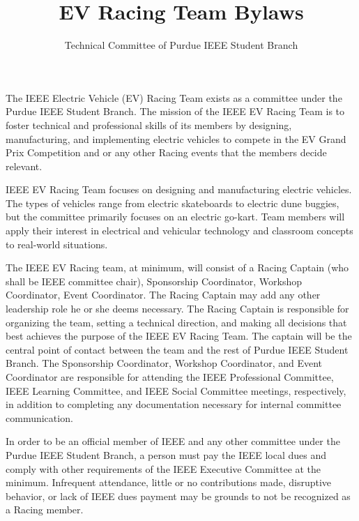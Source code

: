 \documentclass[12pt]{constitution}
\title{EV Racing Team Bylaws}
\author{Technical Committee of Purdue IEEE Student Branch}
\date{}
\begin{document}

\titlecontentspage
\newpage


\label{art:racing}

The IEEE Electric Vehicle (EV) Racing Team exists as a committee under the Purdue IEEE Student Branch. The mission of the IEEE EV Racing Team is to foster technical and professional skills of its members by designing, manufacturing, and implementing electric vehicles to compete in the EV Grand Prix Competition and or any other Racing events that the members decide relevant.


\label{art:purpose}

IEEE EV Racing Team focuses on designing and manufacturing electric vehicles. The types of vehicles range from electric skateboards to electric dune buggies, but the committee primarily focuses on an electric go-kart. Team members will apply their interest in electrical and vehicular technology and classroom concepts to real-world situations.

\label{art:memlead}

The IEEE EV Racing team, at minimum, will consist of a Racing Captain (who shall be IEEE committee chair), Sponsorship Coordinator, Workshop Coordinator, Event Coordinator. The Racing Captain may add any other leadership role he or she deems necessary. The Racing Captain is responsible for organizing the team, setting a technical direction, and making all decisions that best achieves the purpose of the IEEE EV Racing Team. The captain will be the central point of contact between the team and the rest of Purdue IEEE Student Branch. The Sponsorship Coordinator, Workshop Coordinator, and Event Coordinator are responsible for attending the IEEE Professional Committee, IEEE Learning Committee, and IEEE Social Committee meetings, respectively, in addition to completing any documentation necessary for internal committee communication.

In order to be an official member of IEEE and any other committee under the Purdue IEEE Student Branch, a person must pay the IEEE local dues and comply with other requirements of the IEEE Executive Committee at the minimum. Infrequent attendance, little or no contributions made, disruptive behavior, or lack of IEEE dues payment may be grounds to not be recognized as a Racing member.
\end{document}
